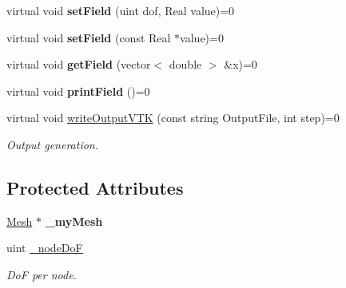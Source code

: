 \begin{DoxyCompactItemize}
\item 
\hypertarget{classvoom_1_1_model_aad43f57864b10515abe0610e289015d7}{
virtual void {\bfseries setField} (uint dof, Real value)=0}
\label{classvoom_1_1_model_aad43f57864b10515abe0610e289015d7}

\item 
\hypertarget{classvoom_1_1_model_a9414ae74324628169bbc2d0f1b0bed0f}{
virtual void {\bfseries setField} (const Real $\ast$value)=0}
\label{classvoom_1_1_model_a9414ae74324628169bbc2d0f1b0bed0f}

\item 
\hypertarget{classvoom_1_1_model_a2fb870d9277fbddb0faf798d3eedae49}{
virtual void {\bfseries getField} (vector$<$ double $>$ \&x)=0}
\label{classvoom_1_1_model_a2fb870d9277fbddb0faf798d3eedae49}

\item 
\hypertarget{classvoom_1_1_model_a9c40bbb7116486b57d74002afd553759}{
virtual void {\bfseries printField} ()=0}
\label{classvoom_1_1_model_a9c40bbb7116486b57d74002afd553759}

\item 
\hypertarget{classvoom_1_1_model_a203eb15708baf43d7aea7ba7312b3aaf}{
virtual void \hyperlink{classvoom_1_1_model_a203eb15708baf43d7aea7ba7312b3aaf}{writeOutputVTK} (const string OutputFile, int step)=0}
\label{classvoom_1_1_model_a203eb15708baf43d7aea7ba7312b3aaf}

\begin{DoxyCompactList}\small\item\em Output generation. \item\end{DoxyCompactList}\end{DoxyCompactItemize}
\subsection*{Protected Attributes}
\begin{DoxyCompactItemize}
\item 
\hypertarget{classvoom_1_1_model_add57ba1ecc4e2dff050789378196d763}{
\hyperlink{classvoom_1_1_mesh}{Mesh} $\ast$ {\bfseries \_\-myMesh}}
\label{classvoom_1_1_model_add57ba1ecc4e2dff050789378196d763}

\item 
\hypertarget{classvoom_1_1_model_aa3affd60781e40ae26575f10a3317e1b}{
uint \hyperlink{classvoom_1_1_model_aa3affd60781e40ae26575f10a3317e1b}{\_\-nodeDoF}}
\label{classvoom_1_1_model_aa3affd60781e40ae26575f10a3317e1b}

\begin{DoxyCompactList}\small\item\em DoF per node. \item\end{DoxyCompactList}\end{DoxyCompactItemize}


